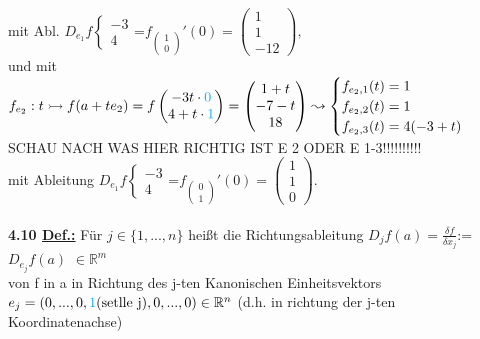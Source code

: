 \documentclass[]{scrartcl}
\begin{document}
	mit Abl. \underline{\underline{$D_{e_1}f\begin{cases}
				-3\\4
			\end{cases}$}}=$f_{\begin{pmatrix}
		1\\0
	\end{pmatrix}}'(0)=\begin{pmatrix}
	1\\1\\-12
	\end{pmatrix},$\\
	und mit $f_{e_2}: t\rightarrowtail f(a+t e_2)=f\begin{pmatrix}
		-3t\cdot\textcolor{cyan}{0}\\4+t\cdot\textcolor{cyan}{1}
	\end{pmatrix}=\begin{pmatrix}
		1+t\\-7-t\\18
	\end{pmatrix}\leadsto\begin{cases}
	f_{e_2,1}(t)=1\\f_{e_2,2}(t)=1\\f_{e_2,3}(t)=4(-3+t)
	\end{cases}$\\SCHAU NACH WAS HIER RICHTIG IST E 2 ODER E 1-3!!!!!!!!!!\\
	mit Ableitung \underline{\underline{$D_{e_1}f\begin{cases}
			-3\\4
		\end{cases}$}}=$f_{\begin{pmatrix}
		0\\1
		\end{pmatrix}}'(0)=\begin{pmatrix}
	1\\1\\0
	\end{pmatrix}$.\\
	\\
	\textbf{4.10 \underline{Def.:}} Für $j\in\{1,...,n\}$ heißt die Richtungsableitung  \ul{$D_jf(a)=\frac{\delta f}{\delta x_j}$}:=\ul{$D_{e_j}f(a)$} $\in \mathbb{R}^m$\\
	von f in a in Richtung des j-ten Kanonischen Einheitsvektors $e_j = (0,...,0,\textcolor{cyan}{1}(\text{setlle j}),0,...,0)\in\mathbb{R}^n\\$
	(d.h. in richtung der j-ten Koordinatenachse)\\
\end{document}
